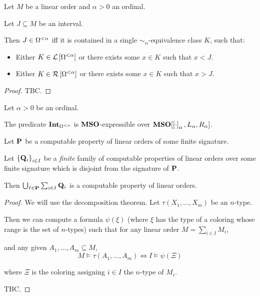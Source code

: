 \begin{lemma}\label{alpha-expressible}
  Let $M$ be a linear order and $\alpha > 0$ an ordinal.

  Let $J \subseteq M$ be an interval.

  Then $J \in \Omega^{< \alpha}$ iff
  it is contained in a single $\sim_{\alpha}$-equivalence class $K$, such that:
  \begin{itemize}
    \item Either $K \in \mathcal{L} \left[ {{\Omega^{< \alpha}}} \right]$ or
          there exists some $x \in K$ such that $x < J$.
    \item Either $K \in \mathcal{R} \left[ {{\Omega^{< \alpha}}} \right]$ or
          there exists some $x \in K$ such that $x > J$.
  \end{itemize}
\end{lemma}

\begin{proof}
  TBC.
\end{proof}

\begin{corollary}\label{int-expressible}
  Let $\alpha > 0$ be an ordinal.

  The predicate $\mathbf{Int}_{\Omega^{< \alpha}}$ is $\mathbf{MSO}$-expressible over
  $\mathbf{MSO}[\left[ {\cdot} \right]_{\alpha}, L_{\alpha}, R_{\alpha}]$.
\end{corollary}

\begin{theorem}\label{computable-sum}
  Let $\mathbf{P}$ be a computable property of linear orders of some finite signature.

  Let $\left\{ {\mathbf{Q}_i} \right\}_{i \in I}$ be a \emph{finite} family of computable properties of linear orders
  over some finite signature which is disjoint from the signature of $\mathbf{P}$.

  Then $\bigcup_{I \in \mathbf{P}} \sum_{i \in I} \mathbf{Q}_{i}$ is a computable property of linear orders.
\end{theorem}

\begin{proof}
  We will use the decomposition theorem.
  Let $\tau(X_1, \ldots, X_m)$ be an $n$-type.

  Then we can compute a formula $\psi(\xi)$ (where
  $\xi$ has the type of a coloring whose range is
  the set of $n$-types) such that
  for any linear order $M = \sum_{i \in I} M_i$,

  and any given $A_1, \ldots, A_m \subseteq M$,
  \[
    M \models \tau(A_1, \ldots, A_m)
    \iff I \models \psi(\Xi)
  \]

  where $\Xi$ is the coloring assigning $i \in I$ the $n$-type of $M_i$.

  TBC.
\end{proof}

